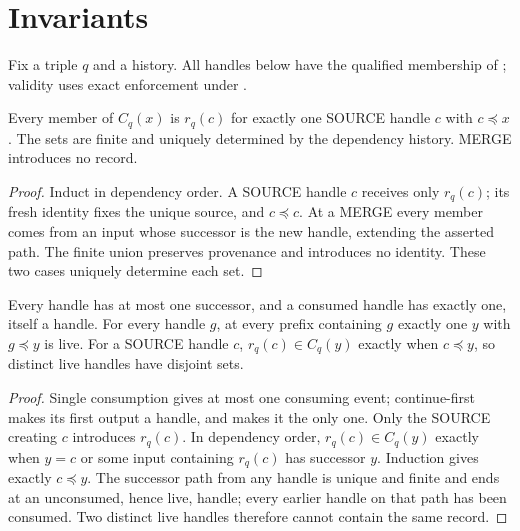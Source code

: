 \documentclass[../main.tex]{subfiles}
\begin{document}
\section{Invariants}
\label{sec:kpcfixed:invariants}

Fix a triple $q$ and a history. All handles below have the qualified
membership of ; validity uses
exact enforcement under .

\begin{theorem}
\label{thm:kpcfixed-invariants:source-provenance}
Every member of $C_q(x)$ is $r_q(c)$ for exactly one SOURCE handle $c$
with $c\preceq x$. The sets are finite and uniquely determined by the
dependency history. MERGE introduces no record.
\end{theorem}
\begin{proof}
Induct in dependency order. A SOURCE handle $c$ receives only $r_q(c)$;
its fresh identity fixes the unique source, and $c\preceq c$.
At a MERGE every member comes from an input whose successor is the new
handle, extending the asserted path. The finite union preserves provenance
and introduces no identity. These two cases uniquely determine each set.
\end{proof}

\begin{theorem}
\label{thm:kpcfixed-invariants:unique-successor}
Every handle has at most one successor, and a consumed handle has exactly
one, itself a handle. For every handle $g$, at every prefix containing
$g$ exactly one $y$ with $g\preceq y$ is live. For a SOURCE handle $c$,
$r_q(c)\in C_q(y)$ exactly when $c\preceq y$, so distinct live handles
have disjoint sets.
\end{theorem}
\begin{proof}
Single consumption gives at most one consuming event; continue-first
makes its first output a handle, and  makes it the only one.
Only the SOURCE creating $c$ introduces $r_q(c)$. In dependency order,
$r_q(c)\in C_q(y)$ exactly when $y=c$ or some input containing $r_q(c)$
has successor $y$. Induction gives exactly $c\preceq y$. The successor
path from any handle is unique and finite and ends at an unconsumed,
hence live, handle; every earlier handle on that path has been consumed.
Two distinct live handles therefore cannot contain the same record.
\end{proof}
\end{document}
